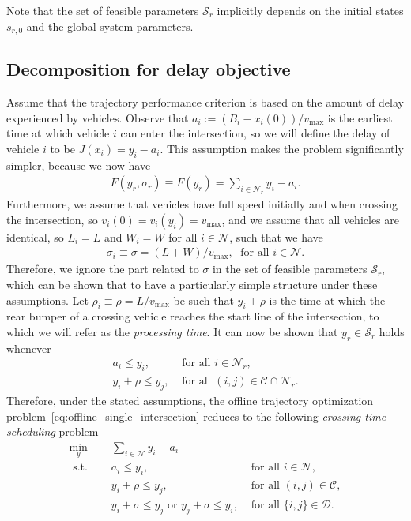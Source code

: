 \documentclass[a4paper]{article}
\theoremstyle{definition}
\theoremstyle{plain}
\begin{document}
Note that the set of feasible parameters $\mathcal{S}_{r}$ implicitly depends on
the initial states ${s}_{r,0}$ and the global system parameters.


\subsection{Decomposition for delay objective}

Assume that the trajectory performance criterion is based on the amount of delay experienced by vehicles.
Observe that $a_{i} := (B_{i} - x_{i}(0)) / v_{\max}$ is the earliest time at
which vehicle $i$ can enter the intersection, so we will define the delay of
vehicle $i$ to be $J(x_{i}) = y_i - a_{i}$. This assumption makes the problem
significantly simpler, because we now have
\begin{align*}
  F(y_{r}, \sigma_{r}) \equiv F(y_{r}) = \sum_{i \in \mathcal{N}_{r}} y_i - a_{i}.
\end{align*}
%
Furthermore, we assume that vehicles have full speed initially and when crossing
the intersection, so $v_{i}(0) = v_{i}(y_i) = v_{\max}$, and we assume that all
vehicles are identical, so $L_{i} = L$ and $W_{i} = W$ for all
$i \in \mathcal{N}$, such that we have
\begin{align*}
\sigma_{i} \equiv \sigma = (L + W) / v_{\max}, \; \text{ for all } i \in \mathcal{N} .
\end{align*}
%
Therefore, we ignore the part related to $\sigma$ in the set of feasible parameters
$\mathcal{S}_{r}$, which can be shown that to have a particularly simple
structure under these assumptions.
Let $\rho_{i} \equiv \rho = L / v_{\max}$ be such that $y_i + \rho$ is the time at which the rear
bumper of a crossing vehicle reaches the start line of the intersection, to
which we will refer as the \textit{processing time}. It can now be shown that
$y_{r} \in \mathcal{S}_{r}$ holds whenever
\begin{align*}
  a_{i} \leq y_i , & \text{ for all } i \in \mathcal{N}_{r} , \\
  y_i + \rho \leq y_j , & \text{ for all } (i,j) \in \mathcal{C} \cap \mathcal{N}_{r} .
\end{align*}
Therefore, under the stated assumptions, the offline trajectory optimization
problem~\eqref{eq:offline_single_intersection} reduces to the following \textit{crossing time scheduling} problem
\begin{subequations}
  \label{eq:crossing_time_scheduling}
\begin{align}
  \min_{y} \quad & \sum_{i \in \mathcal{N}} y_i - a_{i} \\
  \text{ s.t. } \quad & a_{i} \leq y_i , & \text{ for all } i \in \mathcal{N} , \\
                    & y_i + \rho \leq y_{j} , & \text{ for all } (i,j) \in \mathcal{C} \label{eq:conjunctive} , \\
                    & y_i + \sigma \leq y_{j} \text{ or } y_j + \sigma \leq y_i , & \text{ for all } \{i,j\} \in \mathcal{D} \label{eq:disjunctive} .
\end{align}
\end{subequations}
\end{document}
